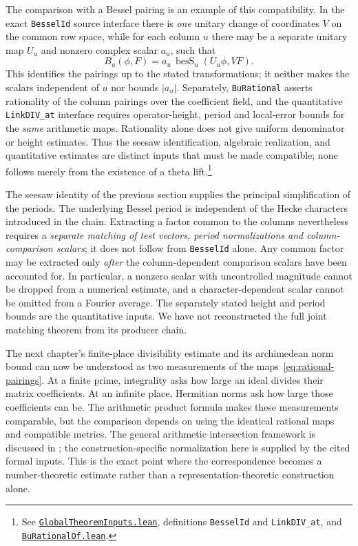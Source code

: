 \documentclass[11pt,openany,oneside]{scrbook}
\theoremstyle{definition}
\theoremstyle{remark}
\newcommand{\baseurl}{https://github.com/CocoSgt/riemann-hypothesis-lean/blob/7cbf7a0c32fca1badf05931879a37c3f8a2b03b4/}
\newcommand{\sourcefile}[2]{\href{\baseurl#1}{\texttt{#2}}}
\begin{document}
The comparison with a Bessel pairing is an example of this compatibility.  In the exact \texttt{BesselId} source interface there is \emph{one} unitary change of coordinates $V$ on the common row space, while for each column $u$ there may be a separate unitary map $U_u$ and nonzero complex scalar $a_u$, such that
\[
B_u(\phi,F)=a_u\,\operatorname{besS}_u(U_u\phi,VF).
\]
This identifies the pairings up to the stated transformations; it neither makes the scalars independent of $u$ nor bounds $|a_u|$.  Separately, \texttt{BuRational} asserts rationality of the column pairings over the coefficient field, and the quantitative \texttt{LinkDIV\_at} interface requires operator-height, period and local-error bounds for the \emph{same} arithmetic maps.  Rationality alone does not give uniform denominator or height estimates.  Thus the seesaw identification, algebraic realization, and quantitative estimates are distinct inputs that must be made compatible; none follows merely from the existence of a theta lift.\footnote{See \sourcefile{src/Formalism/SharpRestriction/GlobalTheoremInputs.lean}{GlobalTheoremInputs.lean}, definitions \texttt{BesselId} and \texttt{LinkDIV\_at}, and \sourcefile{src/Formalism/LocalToGlobal/Divisibility/DivisibilityRemainder/RationalColumns/BuRationalOf.lean}{BuRationalOf.lean}.}

The seesaw identity of the previous section supplies the principal simplification of the periods. The underlying Bessel period is independent of the Hecke characters introduced in the chain. Extracting a factor common to the columns nevertheless requires a \emph{separate matching of test vectors, period normalizations and column-comparison scalars}; it does not follow from \texttt{BesselId} alone. Any common factor may be extracted only \emph{after} the column-dependent comparison scalars have been accounted for. In particular, a nonzero scalar with uncontrolled magnitude cannot be dropped from a numerical estimate, and a character-dependent scalar cannot be omitted from a Fourier average. The separately stated height and period bounds are the quantitative inputs. We have not reconstructed the full joint matching theorem from its producer chain.

The next chapter's finite-place divisibility estimate and its archimedean norm bound can now be understood as two measurements of the maps~\eqref{eq:rational-pairings}.  At a finite prime, integrality asks how large an ideal divides their matrix coefficients.  At an infinite place, Hermitian norms ask how large those coefficients can be.  The arithmetic product formula makes these measurements comparable, but the comparison depends on using the identical rational maps and compatible metrics. The general arithmetic intersection framework is discussed in \textcite{GilletSoule1990}; the construction-specific normalization here is supplied by the cited formal inputs.  This is the exact point where the correspondence becomes a number-theoretic estimate rather than a representation-theoretic construction alone.
\end{document}
